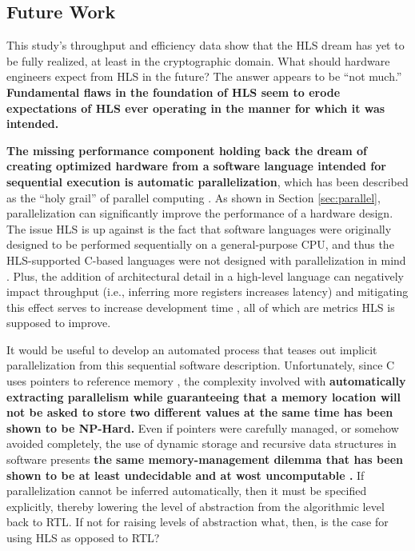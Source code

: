 \documentclass[12pt,journal,compsoc,onecolumn]{IEEEtran}
\begin{document}
\subsection{Future Work}\label{sec:future}
This study's throughput and efficiency data show that the HLS dream has yet to be fully realized, at least in the cryptographic domain. What should hardware engineers expect from HLS in the future? The answer appears to be ``not much.'' \textbf{Fundamental flaws in the foundation of HLS seem to erode expectations of HLS ever operating in the manner for which it was intended.}

\textbf{The missing performance component holding back the dream of creating optimized hardware from a software language intended for sequential execution is automatic parallelization}, which has been described as the ``holy grail'' of parallel computing \cite{holygrail}. As shown in Section \ref{sec:parallel}, parallelization can significantly improve the performance of a hardware design. The issue HLS is up against is the fact that software languages were originally designed to be performed sequentially on a general-purpose CPU, and thus the HLS-supported C-based languages were not designed with parallelization in mind \cite{clanguage}. Plus, the addition of architectural detail in a high-level language can negatively impact throughput (i.e., inferring more registers increases latency) and mitigating this effect serves to increase development time \cite{bsv}, all of which are metrics HLS is supposed to improve. 

It would be useful to develop an automated process that teases out implicit parallelization from this sequential software description. Unfortunately, since C uses pointers to reference memory \cite{cpointers}, the complexity involved with \textbf{automatically extracting parallelism while guaranteeing that a memory location will not be asked to store two different values at the same time has been shown to be NP-Hard\cite{aliasinghard}.} Even if pointers were carefully managed, or somehow avoided completely, the use of dynamic storage and recursive data structures in software presents \textbf{the same memory-management dilemma that has been shown to be at least undecidable and at wost uncomputable \cite{staticanalysis}.} If parallelization cannot be inferred automatically, then it must be specified explicitly, thereby lowering the level of abstraction from the algorithmic level back to RTL\cite{wipliez}. If not for raising levels of abstraction what, then, is the case for using HLS as opposed to RTL?  
\end{document}
